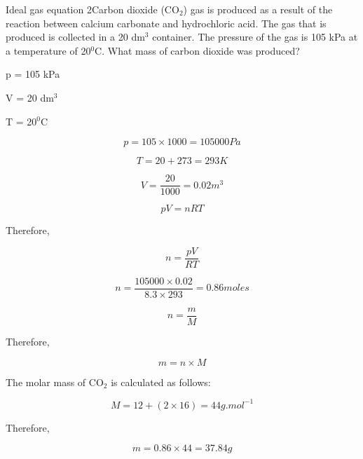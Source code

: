 \begin{wex}{Ideal gas equation 2}{Carbon dioxide (CO$_{2}$) gas is produced as a result of the reaction between calcium carbonate and hydrochloric acid. The gas that is produced is collected in a 20 dm$^{3}$ container. The pressure of the gas is 105 kPa at a temperature of 20$^{0}$C. What mass of carbon dioxide was produced?\\}

{

p = 105 kPa

V = 20 dm$^{3}$

T = 20$^{0}$C
\\
}

{


\begin{equation*}
p = 105 \times 1000 = 105 000 Pa
\end{equation*}

\begin{equation*}
T = 20 + 273 = 293 K
\end{equation*}

\begin{equation*}
V = \frac{20}{1000} = 0.02 m^{3}
\end{equation*}
}

{

\begin{equation*}
pV = nRT
\end{equation*}

Therefore,

\begin{equation*}
n = \frac{pV}{RT}
\end{equation*}
}

{

\begin{equation*}
n = \frac{105 000 \times 0.02}{8.3 \times 293} = 0.86 moles
\end{equation*}
}

{

\begin{equation*}
n = \frac{m}{M}
\end{equation*}

Therefore,

\begin{equation*}
m = n \times M
\end{equation*}

The molar mass of CO$_{2}$ is calculated as follows:

\begin{equation*}
M = 12 + (2 \times 16) = 44g.mol^{-1}
\end{equation*}

Therefore,

\begin{equation*}
m = 0.86 \times 44 = 37.84 g
\end{equation*}
}

\end{wex}

